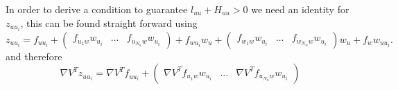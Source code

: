 %
In order to derive a condition to guarantee $l_{uu}+H_{uu}>0$ we need an identity for $z_{uu_i}$, this
can be found straight forward using
%
\begin{equation}
	z_{uu_i} = f_{uu_i} + \left(\begin{array}{ccc}
	f_{u_1w}w_{u_i} & \dots & f_{u_{N_u}w} w_{u_i}
	\end{array}\right) + f_{wu_i}w_u + \left(\begin{array}{ccc}
	f_{w_1w} w_{u_i} & \dots & f_{w_{N_w}w}w_{u_i}
	\end{array}\right)w_u + f_w w_{uu_i}.
\end{equation}
%
and therefore
%
\begin{equation}
	\nabla V^T z_{uu_i} = \nabla V^T f_{uu_i} + \left(\begin{array}{ccc}\nabla V^T f_{u_1w}w_{u_i}&\dots 
	&\nabla V^T f_{u_{N_u}w}w_{u_i}\end{array}\right)
\end{equation}



